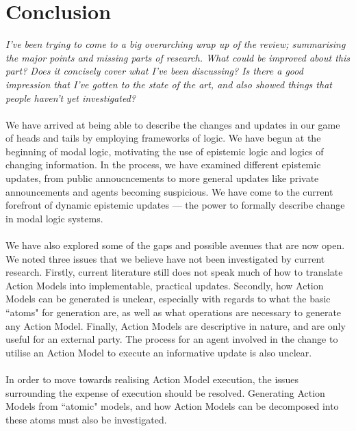 \documentclass[12pt, a4paper, twoside]{article}
\begin{document}
\section{Conclusion} \label{conc}
{\em I've been trying to come to a big overarching wrap up of the review;
	summarising the major points and missing parts of research.
What could be improved about this part?
Does it concisely cover what I've been discussing?
Is there a good impression that I've gotten to the state of the art, and also
showed things that people haven't yet investigated?}\\
\\
We have arrived at being able to describe the changes and updates in our game of
heads and tails by employing frameworks of logic.
We have begun at the beginning of modal logic, motivating the use of epistemic
logic and logics of changing information.
In the process, we have examined different epistemic updates, from public
annoucncements to more general updates like private announcements and agents
becoming suspicious.
We have come to the current forefront of dynamic epistemic updates --- the
power to formally describe change in modal logic systems.\\
\\
We have also explored some of the gaps and possible avenues that are now open.
We noted three issues that we believe have not been investigated by current
research.
Firstly, current literature still does not speak much of how to translate Action Models
into implementable, practical updates.
Secondly, how Action Models can be generated is unclear, especially with regards to what
the basic ``atoms" for generation are, as well as what operations are necessary
to generate any Action Model.
Finally, Action Models are descriptive in nature, and are only useful for an
external party.
The process for an agent involved in the change to utilise an Action Model to
execute an informative update is also unclear.\\
\\
In order to move towards realising Action Model execution, the issues
surrounding the expense of execution should be resolved.
Generating Action Models from ``atomic" models, and how Action Models can be
decomposed into these atoms must also be investigated.



\end{document}
